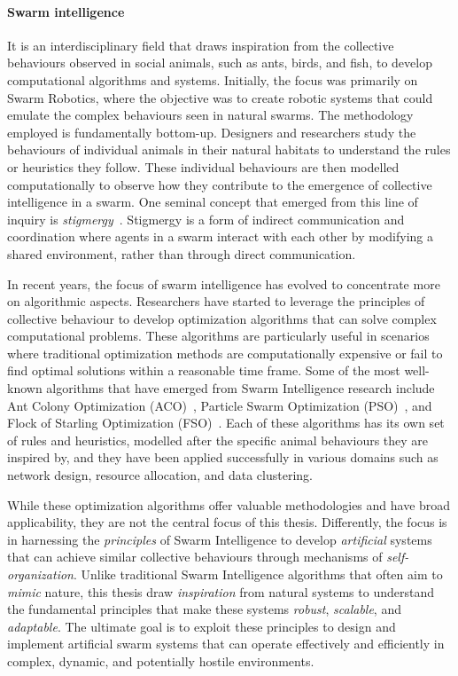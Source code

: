 \paragraph*{Swarm intelligence} It is an interdisciplinary field that draws inspiration from the collective behaviours observed in social animals, 
 such as ants, birds, and fish, to develop computational algorithms and systems. 
 Initially, the focus was primarily on Swarm Robotics, 
 where the objective was to create robotic systems that could emulate the complex behaviours seen in natural swarms. 
 The methodology employed is fundamentally bottom-up. 
 Designers and researchers study the behaviours of individual animals in their natural habitats to understand the rules or heuristics they follow. 
 These individual behaviours are then modelled computationally to observe how they contribute to the emergence of collective intelligence in a swarm. 
 One seminal concept that emerged from this line of inquiry is \textit{stigmergy}~\cite{DBLP:journals/fgcs/DorigoBT00}. 
 Stigmergy is a form of indirect communication and coordination where agents in a swarm interact with each other by modifying a shared environment, rather than through direct communication.

In recent years, the focus of swarm intelligence has evolved to concentrate more on algorithmic aspects. 
 Researchers have started to leverage the principles of collective behaviour to develop optimization algorithms that can solve complex computational problems. 
 These algorithms are particularly useful in scenarios where traditional optimization methods are computationally expensive or fail to find optimal solutions within a reasonable time frame. 
 Some of the most well-known algorithms that have emerged from Swarm Intelligence research include Ant Colony Optimization (ACO)~\cite{DBLP:journals/tsmc/DorigoMC96}, Particle Swarm Optimization (PSO)~\cite{DBLP:conf/icnn/KennedyE95}, and Flock of Starling Optimization (FSO)~\cite{DBLP:series/sci/FulgineiS11}. 
Each of these algorithms has its own set of rules and heuristics, modelled after the specific animal behaviours they are inspired by, and they have been applied successfully in various domains such as network design, resource allocation, and data clustering.

While these optimization algorithms offer valuable methodologies and have broad applicability, they are not the central focus of this thesis. 
 Differently, the focus is in harnessing the \emph{principles} of Swarm Intelligence to develop \emph{artificial} systems that can achieve similar collective behaviours through mechanisms of \emph{self-organization}. 
 Unlike traditional Swarm Intelligence algorithms that often aim to \textit{mimic} nature, this thesis draw \textit{inspiration} from natural systems to understand the fundamental principles that make these systems \emph{robust}, \emph{scalable}, and \emph{adaptable}. 
 The ultimate goal is to exploit these principles to design and implement artificial swarm systems that can operate effectively and efficiently in complex, dynamic, and potentially hostile environments. 
 
